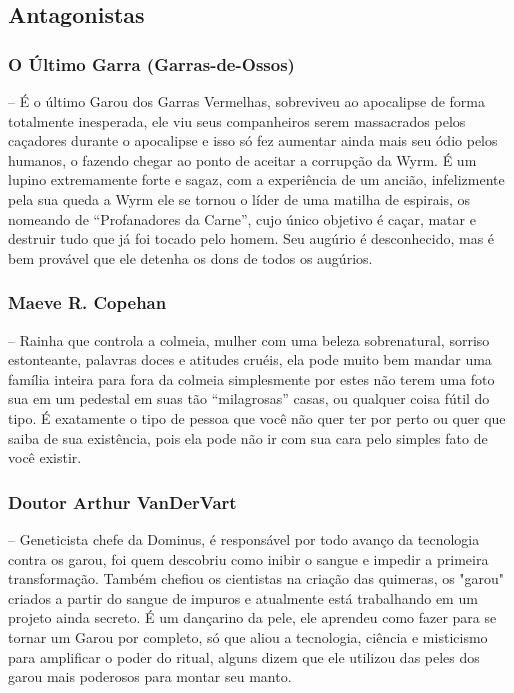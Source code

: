 \subsection{\bf Antagonistas}
\subsubsection{\bf O Último Garra (Garras-de-Ossos)} – É o último Garou dos Garras Vermelhas, sobreviveu ao apocalipse de forma totalmente inesperada, ele viu seus companheiros serem massacrados pelos caçadores durante o apocalipse e isso só fez aumentar ainda mais seu ódio pelos humanos, o fazendo chegar ao ponto de aceitar a corrupção da Wyrm. É um lupino extremamente forte e sagaz, com a experiência de um ancião, infelizmente pela sua queda a Wyrm ele se tornou o líder de uma matilha de espirais, os nomeando de “Profanadores da Carne”, cujo único objetivo é caçar, matar e destruir tudo que já foi tocado pelo homem. Seu augúrio é desconhecido, mas é bem provável que ele detenha os dons de todos os augúrios.

\subsubsection{\bf Maeve R. Copehan} – Rainha que controla a colmeia, mulher com uma beleza sobrenatural, sorriso estonteante, palavras doces e atitudes cruéis, ela pode muito bem mandar uma família inteira para fora da colmeia simplesmente por estes não terem uma foto sua em um pedestal em suas tão “milagrosas” casas, ou qualquer coisa fútil do tipo. É exatamente o tipo de pessoa que você não quer ter por perto ou quer que saiba de sua existência, pois ela pode não ir com sua cara pelo simples fato de você existir.

\subsubsection{\bf Doutor Arthur VanDerVart} – Geneticista chefe da Dominus, é responsável por todo avanço da tecnologia contra os garou, foi quem descobriu como inibir o sangue e impedir a primeira transformação. Também chefiou os cientistas na criação das quimeras, os "garou" criados a partir do sangue de impuros e atualmente está trabalhando em um projeto ainda secreto. É um dançarino da pele, ele aprendeu como fazer para se tornar um Garou por completo, só que aliou a tecnologia, ciência e misticismo para amplificar o poder do ritual, alguns dizem que ele utilizou das peles dos garou mais poderosos para montar seu manto.

